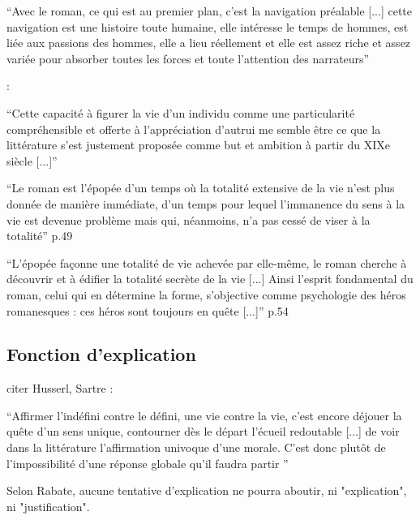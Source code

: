 \documentclass[a4paper,10pt]{article}
\begin{document}
			
			
			\cite{Blanchot1959}
			\begin{center}
				\footnotesize
				\begin{minipage}{0.7\textwidth}
					``Avec le roman, ce qui est au premier plan, c'est la navigation préalable [...] cette navigation est une histoire toute humaine, elle intéresse le temps de hommes, est liée aux passions des hommes, elle a lieu réellement et elle est assez riche et assez variée pour absorber toutes les forces et toute l'attention des narrateurs''
				\end{minipage}
			\end{center}
			\cite{Rabate2010} :
			\begin{center}
				\footnotesize
				\begin{minipage}{0.7\textwidth}
					``Cette capacité à figurer la vie d’un individu comme une particularité compréhensible
					et offerte à l’appréciation d’autrui me semble être ce que la littérature s’est justement proposée
					comme but et ambition à partir du XIXe siècle [...]''
				\end{minipage}
			\end{center}
			\cite{Lukacs191649}
			\begin{center}
				\footnotesize
				\begin{minipage}{0.7\textwidth}
					``Le roman est l'épopée d'un temps où la totalité extensive de la vie n'est plus donnée de manière immédiate, d'un temps pour lequel l'immanence du sens à la vie est devenue problème mais qui, néanmoins, n'a pas cessé de viser à la totalité'' p.49
				\end{minipage}
			\end{center}
			
			\cite{Lukacs191654}
			\begin{center}
				\footnotesize
				\begin{minipage}{0.7\textwidth}
					``L'épopée façonne une totalité de vie achevée par elle-même, le roman cherche à découvrir et à édifier la totalité secrète de la vie [...] Ainsi l'esprit fondamental du roman, celui qui en détermine la forme, s'objective comme psychologie des héros romanesques : ces héros sont toujours en quête [...]'' p.54
				\end{minipage}
			\end{center}
		\subsection{Fonction d'explication}
			citer Husserl, Sartre
			\cite{Rabate2010} :
			\begin{center}
				\footnotesize
				\begin{minipage}{0.7\textwidth}
					``Affirmer l’indéfini contre le défini, une vie contre la vie, c’est encore déjouer la quête d’un sens
					unique, contourner dès le départ l’écueil redoutable [...] de voir dans la littérature l’affirmation univoque d’une morale. C’est donc plutôt de l’impossibilité d’une réponse globale qu’il faudra partir ''
				\end{minipage}
			\end{center}
			Selon Rabate, aucune tentative d'explication ne pourra aboutir, ni "explication", ni "justification".
\end{document}
